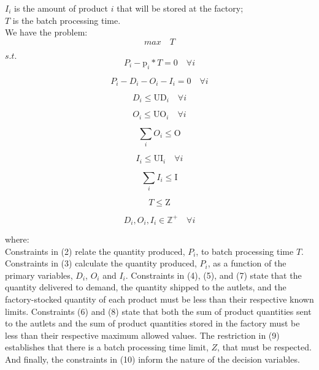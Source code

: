 \documentclass[preprint,12pt,authoryear]{elsarticle}
\begin{document}
$I_i$ is the amount of product $i$ that will be stored at the factory; \\

$T$ is the batch processing time. \\

We have the problem: \\

\begin{equation}
max \quad T
\end{equation}

$s.t.$ \\

\begin{equation}
P_i - \textrm{p}_i * T  = 0 \quad \forall i
\end{equation}

\begin{equation}
P_i - D_i - O_i - I_i = 0 \quad \forall i
\end{equation}

\begin{equation}
D_i \leq \textrm{UD}_i \quad \forall i
\end{equation}

\begin{equation}
O_i \leq \textrm{UO}_i \quad \forall i
\end{equation}

\begin{equation}
\sum_i{O_i} \leq \textrm{O}
\end{equation}

\begin{equation}
I_i \leq \textrm{UI}_i \quad \forall i
\end{equation}

\begin{equation}
\sum_i{I_i} \leq \textrm{I}
\end{equation}

\begin{equation}
T \leq \textrm{Z}
\end{equation}

\begin{equation}
D_i, O_i, I_i \in  \mathbb{Z}^+ \quad \forall i
\end{equation}

where: \\

Constraints in (2) relate the quantity produced, $P_i$, to batch processing time $T$. Constraints in (3) calculate the quantity produced, $P_i$, as a function of the primary variables, $D_i$, $O_i$ and $I_i$. Constraints in (4), (5), and (7) state that the quantity delivered to demand, the quantity shipped to the autlets, and the factory-stocked quantity of each product must be less than their respective known limits. Constraints (6) and (8) state that both the sum of product quantities sent to the autlets and the sum of product quantities stored in the factory must be less than their respective maximum allowed values. The restriction in (9) establishes that there is a batch processing time limit, $Z$, that must be respected. And finally, the constraints in (10) inform the nature of the decision variables.
\end{document}
